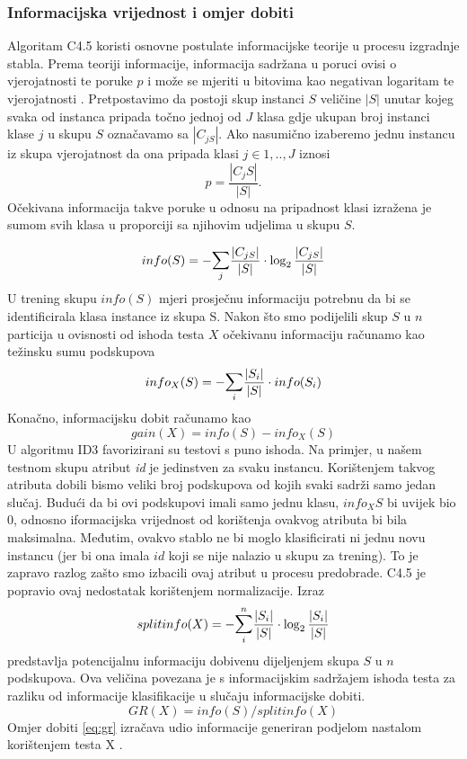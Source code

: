 \subsubsection{Informacijska vrijednost i omjer dobiti}
Algoritam C4.5 koristi osnovne postulate informacijske teorije u procesu izgradnje stabla. Prema teoriji informacije, informacija sadržana u poruci ovisi o vjerojatnosti te poruke $p$ i može se mjeriti u bitovima kao negativan logaritam te vjerojatnosti \cite{Shannon01}. Pretpostavimo da postoji skup instanci $S$ veličine $|S|$ unutar kojeg svaka od instanca pripada točno jednoj od $J$ klasa gdje ukupan broj instanci klase $j$ u skupu $S$ označavamo sa $|C_{jS}|$. Ako nasumično izaberemo jednu instancu iz skupa vjerojatnost da ona pripada klasi $j\in{1,..,J}$ iznosi\begin{equation}
p = \frac{|C_jS|}{|S|}.
\end{equation}
Očekivana informacija takve poruke u odnosu na pripadnost klasi izražena je sumom svih klasa u proporciji sa njihovim udjelima u skupu $S$. 

\begin{equation}
info(S) = -\mathlarger{\sum}_{j}\frac{|C_{jS}|}{|S|}\cdot\log_{2}\frac{|C_{jS}|}{|S|}
\end{equation}
U trening skupu $info(S)$ mjeri prosječnu informaciju potrebnu da bi se identificirala klasa instance iz skupa S. Nakon što smo podijelili skup $S$ u $n$ particija u ovisnosti od ishoda testa $X$ očekivanu informaciju računamo kao težinsku sumu podskupova
\begin{equation}
info_{X}(S) = -\mathlarger{\sum}_{i}\frac{|S_{i}|}{|S|}\cdot info(S_{i})
\end{equation}
Konačno, informacijsku dobit računamo kao
\begin{equation}
gain(X) = info(S)-info_{X}(S)
\end{equation}
U algoritmu ID3 favorizirani su testovi s puno ishoda. Na primjer, u našem testnom skupu atribut \textit{id} je jedinstven za svaku instancu. Korištenjem takvog atributa dobili bismo veliki broj podskupova od kojih svaki sadrži samo jedan slučaj. Budući da bi ovi podskupovi imali samo jednu klasu, $info_{X}S$ bi uvijek bio 0, odnosno iformacijska vrijednost od korištenja ovakvog atributa bi bila maksimalna. Međutim, ovakvo stablo ne bi moglo klasificirati ni jednu novu instancu (jer bi ona imala $id$ koji se nije nalazio u skupu za trening). To je zapravo razlog zašto smo izbacili ovaj atribut u procesu predobrade. C4.5 je popravio ovaj nedostatak korištenjem normalizacije. Izraz
\begin{equation}
split info(X) = -\mathlarger{\sum}_{i}^{n}\frac{|S_{i}|}{|S|}\cdot\log_{2}\frac{|S_{i}|}{|S|}
\end{equation}
predstavlja potencijalnu informaciju dobivenu dijeljenjem skupa $S$ u $n$ podskupova. Ova veličina povezana je s informacijskim sadržajem ishoda testa za razliku od informacije klasifikacije u slučaju informacijske dobiti.
\begin{equation}
\label{eq:gr}
GR(X) = info(S)/split info(X)
\end{equation}
Omjer dobiti \ref{eq:gr} izračava udio informacije generiran podjelom nastalom korištenjem testa X \cite{Quinlan02}.


